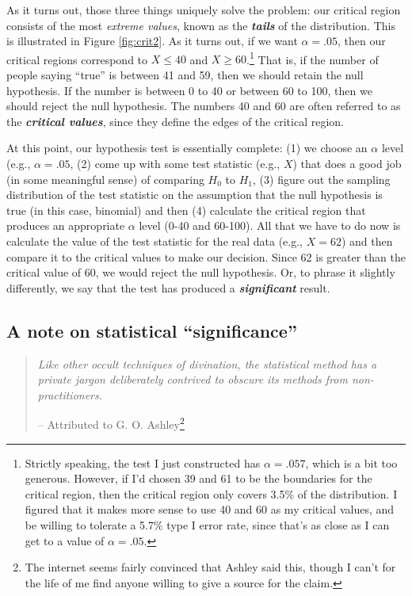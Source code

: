 \documentclass[
]{book}
\begin{document}
As it turns out, those three things uniquely solve the problem: our critical region consists of the most \emph{extreme values}, known as the \textbf{\emph{tails}} of the distribution. This is illustrated in Figure \ref{fig:crit2}. As it turns out, if we want \(\alpha = .05\), then our critical regions correspond to \(X \leq 40\) and \(X \geq 60\).\footnote{Strictly speaking, the test I just constructed has \(\alpha = .057\), which is a bit too generous. However, if I'd chosen 39 and 61 to be the boundaries for the critical region, then the critical region only covers 3.5\% of the distribution. I figured that it makes more sense to use 40 and 60 as my critical values, and be willing to tolerate a 5.7\% type I error rate, since that's as close as I can get to a value of \(\alpha = .05\).} That is, if the number of people saying ``true'' is between 41 and 59, then we should retain the null hypothesis. If the number is between 0 to 40 or between 60 to 100, then we should reject the null hypothesis. The numbers 40 and 60 are often referred to as the \textbf{\emph{critical values}}, since they define the edges of the critical region.

At this point, our hypothesis test is essentially complete: (1) we choose an \(\alpha\) level (e.g., \(\alpha = .05\), (2) come up with some test statistic (e.g., \(X\)) that does a good job (in some meaningful sense) of comparing \(H_0\) to \(H_1\), (3) figure out the sampling distribution of the test statistic on the assumption that the null hypothesis is true (in this case, binomial) and then (4) calculate the critical region that produces an appropriate \(\alpha\) level (0-40 and 60-100). All that we have to do now is calculate the value of the test statistic for the real data (e.g., \(X = 62\)) and then compare it to the critical values to make our decision. Since 62 is greater than the critical value of 60, we would reject the null hypothesis. Or, to phrase it slightly differently, we say that the test has produced a \textbf{\emph{significant}} result.

\hypertarget{a-note-on-statistical-significance}{%
\subsection{A note on statistical ``significance''}\label{a-note-on-statistical-significance}}

\begin{quote}
\emph{Like other occult techniques of divination, the statistical method has a private jargon deliberately contrived to obscure its methods from non-practitioners.}

-- Attributed to G. O. Ashley\footnote{The internet seems fairly convinced that Ashley said this, though I can't for the life of me find anyone willing to give a source for the claim.}
\end{quote}
\end{document}
